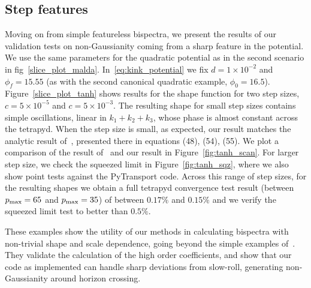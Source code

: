 \subsection{Step features}
Moving on from simple featureless bispectra, we present the results of
our validation tests on non-Gaussianity coming from a sharp feature in the potential.
We use the same parameters for the quadratic potential as in the
second scenario in fig~\ref{slice_plot_malda}.
In~\eqref{eq:kink_potential}
we fix $d=1\times10^{-2}$ and $\phi_{f}=15.55$
(as with the second canonical quadratic example, $\phi_0=16.5$).
Figure~\ref{slice_plot_tanh}
shows results for the shape function for two step sizes,
$c=5\times10^{-5}$ and $c=5\times10^{-3}$.
The resulting shape for small step sizes contains simple oscillations,
linear in $k_1+k_2+k_3$,
whose phase is almost constant across the tetrapyd.
When the step size is small, as expected,
our result matches the analytic result of~\cite{adshead},
presented there in equations (48), (54), (55).
We plot a comparison of the result of~\cite{adshead} and our result
in Figure~\ref{fig:tanh_scan}.
For larger step size, we check the squeezed limit in Figure~\ref{fig:tanh_sqz},
where we also show point tests against the PyTransport code.
Across this range of step sizes, for the resulting shapes we obtain
a full tetrapyd convergence test result
(between $p_\text{max}=65$ and $p_\text{max}=35$)
of between $0.17\%$ and $0.15\%$ and
we verify the squeezed limit test to better than $0.5\%$.

These examples show the utility of our methods in
calculating bispectra with non-trivial shape and scale dependence,
going beyond the simple examples of~\cite{Funakoshi}.
They validate the calculation of the high order coefficients,
and show that our code as implemented can handle sharp deviations from slow-roll,
generating non-Gaussianity around horizon crossing.


